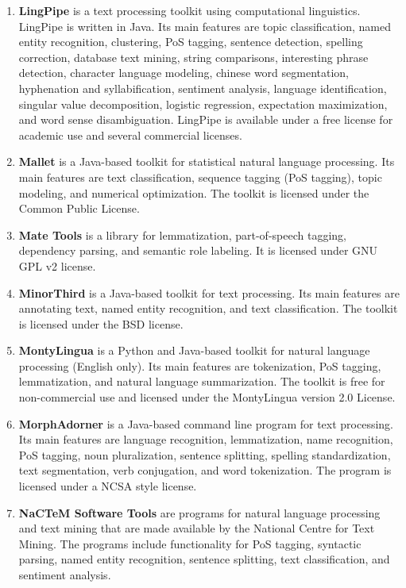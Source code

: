 \begin{enumerate}
	\item \textbf{LingPipe} \cite{lingpipe} is a text processing toolkit using computational linguistics. LingPipe is written in Java. Its main features are topic classification, named entity recognition, clustering, PoS tagging, sentence detection, spelling correction, database text mining, string comparisons, interesting phrase detection, character language modeling, chinese word segmentation, hyphenation and syllabification, sentiment analysis, language identification, singular value decomposition, logistic regression, expectation maximization, and word sense disambiguation.
LingPipe is available under a free license for academic use and several commercial licenses.

	\item \textbf{Mallet} \cite{mccallum2002mallet} is a Java-based toolkit for statistical natural language processing. Its main features are text classification, sequence tagging (PoS tagging), topic modeling, and numerical optimization.
The toolkit is licensed under the Common Public License.

	\item \textbf{Mate Tools} \cite{mateTools} is a library for lemmatization, part-of-speech tagging, dependency parsing, and semantic role labeling. It is licensed under GNU GPL v2 license.

	\item \textbf{MinorThird} \cite{cohen2004minorthird} is a Java-based toolkit for text processing. Its main features are annotating text, named entity recognition, and text classification.
The toolkit is licensed under the BSD license.

	\item \textbf{MontyLingua} \cite{liu2004montylingua} is a Python and Java-based toolkit for natural language processing (English only). Its main features are tokenization, PoS tagging, lemmatization, and natural language summarization.
The toolkit is free for non-commercial use and licensed under the MontyLingua version 2.0 License.

	\item \textbf{MorphAdorner} \cite{morphadorner} is a Java-based command line program for text processing. Its main features are language recognition, lemmatization, name recognition, PoS tagging, noun pluralization, sentence splitting, spelling standardization, text segmentation, verb conjugation, and word tokenization.
The program is licensed under a NCSA style license.

	\item \textbf{NaCTeM Software Tools} \cite{nactem} are programs for natural language processing and text mining that are made available by the National Centre for Text Mining. The programs include functionality for PoS tagging, syntactic parsing, named entity recognition, sentence splitting, text classification, and sentiment analysis.


\end{enumerate}
